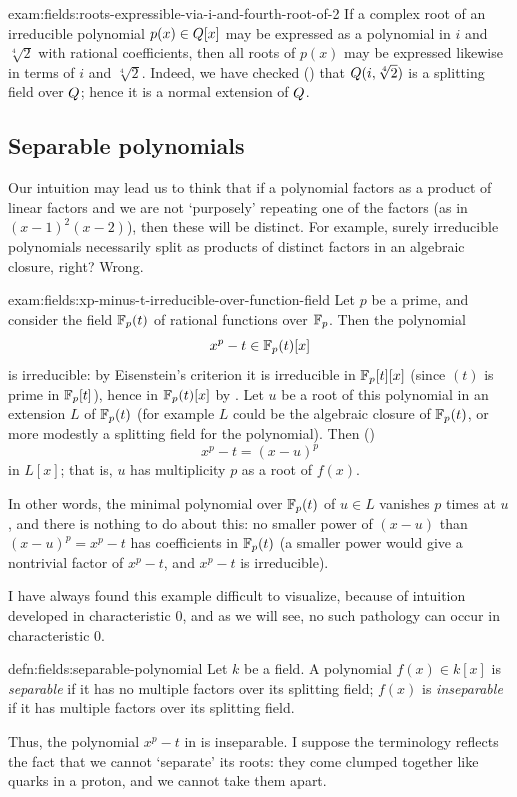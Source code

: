 \begin{exam}{}{exam:fields:roots-expressible-via-i-and-fourth-root-of-2}
  If a complex root of an irreducible polynomial $p(x) \in Q[x]$ may
  be expressed as a polynomial in $i$ and $\sqrt[4]{2}$ with rational
  coefficients, then all roots of $p(x)$ may be expressed likewise in
  terms of $i$ and $\sqrt[4]{2}$. Indeed, we have checked
  () that $Q(i, \sqrt[4]{2})$ is a
  splitting field over $Q$; hence it is a normal extension of $Q$.
\end{exam}

\subsection{Separable polynomials}%
\label{subsec:fields:separable-polynomials}
Our intuition may lead us to think that if a polynomial factors as a
product of linear factors and we are not `purposely' repeating one of
the factors (as in ${(x-1)}^2(x-2)$), then these will be distinct. For
example, surely irreducible polynomials necessarily split as products
of distinct factors in an algebraic closure, right? Wrong.
\begin{exam}{}{exam:fields:xp-minus-t-irreducible-over-function-field}
  Let $p$ be a prime, and consider the field $\mathbb{F}_p(t)$ of rational
  functions over $\mathbb{F}_p$. Then the polynomial
  \[
    x^p - t \in \mathbb{F}_p(t)[x]
  \]
  is irreducible: by Eisenstein's criterion it is irreducible in
  $\mathbb{F}_p[t][x]$ (since $(t)$ is prime in $\mathbb{F}_p[t]$), hence in
  $\mathbb{F}_p(t)[x]$ by . Let $u$ be a root of this
  polynomial in an extension $L$ of $\mathbb{F}_p(t)$ (for example $L$ could
  be the algebraic closure of $\mathbb{F}_p(t)$, or more modestly a splitting
  field for the polynomial). Then
  ()
  \[
    x^p - t = {(x - u)}^p
  \]
  in $L[x]$; that is, $u$ has multiplicity $p$ as a root of $f(x)$.

  In other words, the minimal polynomial over $\mathbb{F}_p(t)$ of $u \in L$
  vanishes $p$ times at $u$, and there is nothing to do about this: no
  smaller power of $(x-u)$ than ${(x-u)}^p = x^p - t$ has coefficients
  in $\mathbb{F}_p(t)$ (a smaller power would give a nontrivial factor of
  $x^p - t$, and $x^p - t$ is irreducible).
\end{exam}
I have always found this example difficult to visualize, because of
intuition developed in characteristic $0$, and as we will see, no such
pathology can occur in characteristic $0$.
\begin{defn}{}{defn:fields:separable-polynomial}
  Let $k$ be a field. A polynomial $f(x) \in k[x]$ is \emph{separable}
  if it has no multiple factors over its splitting field; $f(x)$ is
  \emph{inseparable} if it has multiple factors over its splitting
  field.
\end{defn}
Thus, the polynomial $x^p - t$ in  is
inseparable. I suppose the terminology reflects the fact that we
cannot `separate' its roots: they come clumped together like quarks in
a proton, and we cannot take them apart.

